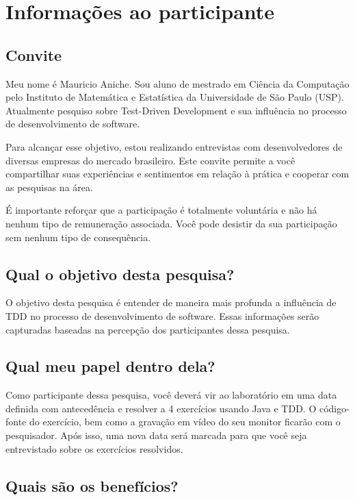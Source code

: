 \chapter{Informações ao participante}
\label{ape:informacoes-participante}

\section{Convite}

Meu nome é Mauricio Aniche. Sou aluno de mestrado em Ciência da Computação pelo
Instituto de Matemática e Estatística da Universidade de São Paulo (USP).
Atualmente pesquiso sobre Test-Driven Development e sua influência no processo
de desenvolvimento de software.

Para alcançar esse objetivo, estou realizando entrevistas com desenvolvedores de
diversas empresas do mercado brasileiro.
Este convite permite a você compartilhar suas experiências e sentimentos em
relação à prática e cooperar com as pesquisas na área.

É importante reforçar que a participação é totalmente voluntária e não há nenhum
tipo de remuneração associada. Você pode desistir da sua participação sem nenhum
tipo de consequência.

\section{Qual o objetivo desta pesquisa?}

O objetivo desta pesquisa é entender de maneira mais profunda a influência de TDD
no processo de desenvolvimento de software. Essas informações serão
capturadas baseadas na percepção dos participantes dessa pesquisa.

\section{Qual meu papel dentro dela?}

Como participante dessa pesquisa, você deverá vir ao laboratório em uma
data definida com antecedência e resolver a 4 exercícios usando Java e TDD.
O código-fonte do exercício, bem como a gravação em vídeo do seu monitor
ficarão com o pesquisador.
Após isso, uma nova data será marcada para que você seja entrevistado sobre
os exercícios resolvidos.

\section{Quais são os benefícios?}

